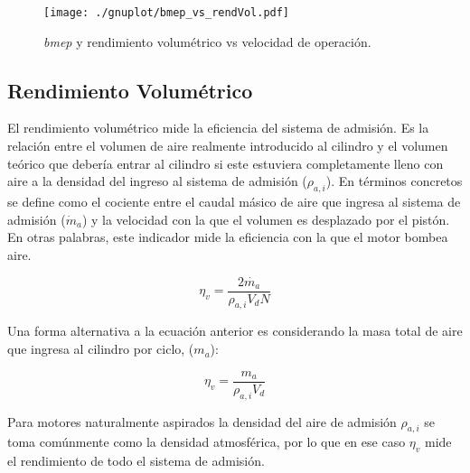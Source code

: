 \begin{figure}[h!]
  \centering
\texttt{[image: ./gnuplot/bmep\_vs\_rendVol.pdf]}
    \caption{\emph{bmep} y rendimiento volumétrico vs velocidad de operación.}
    \label{fig:bmep_tipica}
\end{figure}



\subsection{Rendimiento Volumétrico}
%
El rendimiento volumétrico mide la eficiencia del sistema de admisión.
%
Es la relación entre el volumen de aire realmente introducido al cilindro y el
volumen teórico que debería entrar al cilindro si este estuviera completamente
lleno con aire a la densidad del ingreso al sistema de admisión ($\rho_{a,i}$).
%
En términos concretos se define como el cociente entre el caudal másico de aire
que ingresa al sistema de admisión ($\dot{m}_{a}$) y la velocidad con la que el
volumen es desplazado por el pistón.
%
En otras palabras, este indicador mide la eficiencia con la que el motor bombea
aire.

\begin{equation}\label{eq:eta_v}
  \eta_v = \frac{2\dot{m_a}}{\rho_{a,i}V_d N}
\end{equation}


Una forma alternativa a la ecuación anterior es considerando la masa total de aire que
ingresa al cilindro por ciclo, ($m_{a}$):

\begin{equation}\label{eq:eta_v_alt}
  \eta_v = \frac{m_a}{\rho_{a,i}V_d}
\end{equation}

Para motores naturalmente aspirados la densidad del aire de admisión
$\rho_{a,i}$ se toma comúnmente como la densidad atmosférica, por lo que en ese
caso $\eta_v$ mide el rendimiento de todo el sistema de admisión.
%

